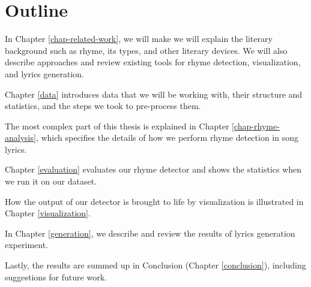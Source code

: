 \section*{Outline}
In Chapter \ref{chap-related-work}, we will make we will explain the literary background such as rhyme, its types, and other literary devices. We will also describe approaches and review existing tools for rhyme detection, visualization, and lyrics generation. 

Chapter \ref{data} introduces data that we will be working with, their structure and statistics, and the steps we took to pre-process them.

The most complex part of this thesis is explained in Chapter \ref{chap-rhyme-analysis}, which specifies the details of how we perform rhyme detection in song lyrics.

Chapter \ref{evaluation} evaluates our rhyme detector and shows the statistics when we run it on our dataset.

How the output of our detector is brought to life by visualization is illustrated in Chapter \ref{visualization}.

In Chapter \ref{generation}, we describe and review the results of lyrics generation experiment.

Lastly, the results are summed up in Conclusion (Chapter \ref{conclusion}), including suggestions for future work.
